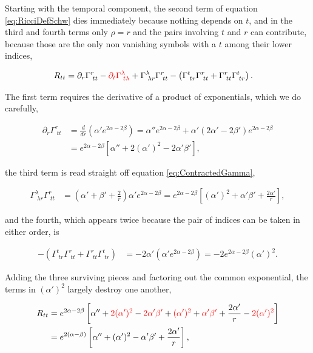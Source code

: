         Starting with the temporal component, the second term of equation \ref{eq:RicciDefSchw} dies immediately because nothing depends on $t$, and in the third and fourth terms only $\rho=r$ and the pairs involving $t$ and $r$ can contribute, because those are the only non vanishing symbols with a $t$ among their lower indices,

        \begin{align*}
            R_{tt} &= \partial_r\Gamma^{r}_{\;tt} - {\color{red}\partial_t\Gamma^{\lambda}_{\;t\lambda}} + \Gamma^{\lambda}_{\;\lambda r}\Gamma^{r}_{\;tt} - \left(\Gamma^{t}_{\;tr}\Gamma^{r}_{\;tt} + \Gamma^{r}_{\;tt}\Gamma^{t}_{\;tr}\right).
        \end{align*}

        The first term requires the derivative of a product of exponentials, which we do carefully,

        \begin{align*}
            \partial_r\Gamma^{r}_{\;tt} &= \frac{d}{dr}\left(\alpha'e^{2\alpha-2\beta}\right) = \alpha''e^{2\alpha-2\beta} + \alpha'\left(2\alpha'-2\beta'\right)e^{2\alpha-2\beta}\\
            &= e^{2\alpha-2\beta}\left[\alpha'' + 2(\alpha')^2 - 2\alpha'\beta'\right],
        \end{align*}

        the third term is read straight off equation \ref{eq:ContractedGamma},

        \begin{align*}
            \Gamma^{\lambda}_{\;\lambda r}\Gamma^{r}_{\;tt} &= \left(\alpha'+\beta'+\frac{2}{r}\right)\alpha'e^{2\alpha-2\beta} = e^{2\alpha-2\beta}\left[(\alpha')^2 + \alpha'\beta' + \frac{2\alpha'}{r}\right],
        \end{align*}

        and the fourth, which appears twice because the pair of indices can be taken in either order, is

        \begin{align*}
            -\left(\Gamma^{t}_{\;tr}\Gamma^{r}_{\;tt} + \Gamma^{r}_{\;tt}\Gamma^{t}_{\;tr}\right) &= -2\alpha'\left(\alpha'e^{2\alpha-2\beta}\right) = -2e^{2\alpha-2\beta}(\alpha')^2.
        \end{align*}

        Adding the three surviving pieces and factoring out the common exponential, the terms in $(\alpha')^2$ largely destroy one another,

        \begin{align*}
            R_{tt} &= e^{2\alpha-2\beta}\left[\alpha'' + {\color{red}2(\alpha')^2} - {\color{red}2\alpha'\beta'} + {\color{red}(\alpha')^2} + {\color{red}\alpha'\beta'} + \frac{2\alpha'}{r} - {\color{red}2(\alpha')^2}\right]\\
            &= e^{2(\alpha-\beta)}\left[\alpha'' + (\alpha')^2 - \alpha'\beta' + \frac{2\alpha'}{r}\right],
        \end{align*}

